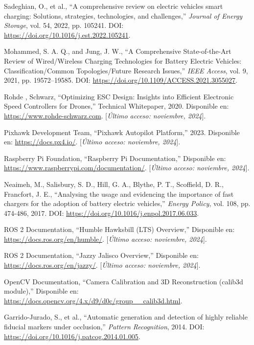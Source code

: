 \begin{thebibliography}{30}
    Sadeghian, O., et al., ``A comprehensive review on electric vehicles smart charging: Solutions, strategies, technologies, and challenges,'' \textit{Journal of Energy Storage}, vol. 54, 2022, pp. 105241. DOI: \url{https://doi.org/10.1016/j.est.2022.105241}.

    Mohammed, S. A. Q., and Jung, J. W., ``A Comprehensive State-of-the-Art Review of Wired/Wireless Charging Technologies for Battery Electric Vehicles: Classification/Common Topologies/Future Research Issues,'' \textit{IEEE Access}, vol. 9, 2021, pp. 19572--19585. DOI: \url{https://doi.org/10.1109/ACCESS.2021.3055027}.

    Rohde , Schwarz, ``Optimizing ESC Design: Insights into Efficient Electronic Speed Controllers for Drones,'' Technical Whitepaper, 2020. Disponible en: \url{https://www.rohde-schwarz.com}. [\textit{Último acceso: noviembre, 2024}].

    Pixhawk Development Team, ``Pixhawk Autopilot Platform,'' 2023. Disponible en: \url{https://docs.px4.io/}. [\textit{Último acceso: noviembre, 2024}].

    Raspberry Pi Foundation, ``Raspberry Pi Documentation,'' Disponible en: \url{https://www.raspberrypi.com/documentation/}. [\textit{Último acceso: noviembre, 2024}].

    Neaimeh, M., Salisbury, S. D., Hill, G. A., Blythe, P. T., Scoffield, D. R., Francfort, J. E., ``Analysing the usage and evidencing the importance of fast chargers for the adoption of battery electric vehicles,'' \textit{Energy Policy}, vol. 108, pp. 474-486, 2017. DOI: \url{https://doi.org/10.1016/j.enpol.2017.06.033}.

    ROS 2 Documentation, ``Humble Hawksbill (LTS) Overview,'' Disponible en: \url{https://docs.ros.org/en/humble/}. [\textit{Último acceso: noviembre, 2024}].
    
    ROS 2 Documentation, ``Jazzy Jalisco Overview,'' Disponible en: \url{https://docs.ros.org/en/jazzy/}. [\textit{Último acceso: noviembre, 2024}].

    OpenCV Documentation, ``Camera Calibration and 3D Reconstruction (calib3d module),'' Disponible en: \url{https://docs.opencv.org/4.x/d9/d0c/group__calib3d.html}.

    Garrido-Jurado, S., et al., ``Automatic generation and detection of highly reliable fiducial markers under occlusion,'' \textit{Pattern Recognition}, 2014. DOI: \url{https://doi.org/10.1016/j.patcog.2014.01.005}.


\end{thebibliography}
